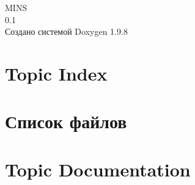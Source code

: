 \documentclass[twoside]{book}
\newcommand{\+}{\discretionary{\mbox{\scriptsize$\hookleftarrow$}}{}{}}
\newcommand{\clearemptydoublepage}{%
    \newpage{\pagestyle{empty}\cleardoublepage}%
  }
\begin{document}
  \raggedbottom
    \hypersetup{pageanchor=false,
                bookmarksnumbered=true,
                pdfencoding=unicode
               }
  \begin{titlepage}
  \vspace*{7cm}
  \begin{center}%
  {\Large MINS}\\
  [1ex]\large 0.\+1 \\
  \vspace*{1cm}
  {\large Создано системой Doxygen 1.9.8}\\
  \end{center}
  \end{titlepage}
  \clearemptydoublepage
  \tableofcontents
  \clearemptydoublepage
  \hypersetup{pageanchor=true}
\chapter{Topic Index}

\chapter{Список файлов}

\chapter{Topic Documentation}



\end{document}
